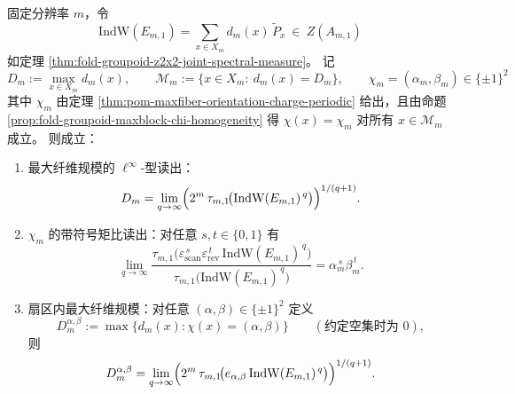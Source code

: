 \begin{corollary}\label{cor:fold-indw-high-q-extract-maxfiber-and-chi}
固定分辨率 \(m\)，令
\[
\mathrm{IndW}(E_{m,1})=\sum_{x\in X_m}d_m(x)\,\widetilde P_x\ \in\ Z(A_{m,1})
\]
如定理 \ref{thm:fold-groupoid-z2x2-joint-spectral-measure}。
记
\[
D_m:=\max_{x\in X_m}d_m(x),\qquad
\mathcal M_m:=\{x\in X_m:\ d_m(x)=D_m\},
\qquad
\chi_m=(\alpha_m,\beta_m)\in\{\pm1\}^2
\]
其中 \(\chi_m\) 由定理 \ref{thm:pom-maxfiber-orientation-charge-periodic} 给出，且由命题 \ref{prop:fold-groupoid-maxblock-chi-homogeneity} 得 \(\chi(x)=\chi_m\) 对所有 \(x\in\mathcal M_m\) 成立。
则成立：
\begin{enumerate}
\normalfont
  \item 最大纤维规模的 \(\ell^\infty\)-型读出：
  \[
  D_m
  =
  \lim_{q\to\infty}\Bigl(2^m\,\tau_{m,1}\!\bigl(\mathrm{IndW}(E_{m,1})^{\,q}\bigr)\Bigr)^{1/(q+1)}.
  \]
  \item \(\chi_m\) 的带符号矩比读出：对任意 \(s,t\in\{0,1\}\) 有
  \[
  \lim_{q\to\infty}
  \frac{\tau_{m,1}\!\bigl(\varepsilon_{\mathrm{scan}}^{\,s}\varepsilon_{\mathrm{rev}}^{\,t}\,\mathrm{IndW}(E_{m,1})^{\,q}\bigr)}
  {\tau_{m,1}\!\bigl(\mathrm{IndW}(E_{m,1})^{\,q}\bigr)}
  =
  \alpha_m^{\,s}\beta_m^{\,t}.
  \]
  \item 扇区内最大纤维规模：对任意 \((\alpha,\beta)\in\{\pm1\}^2\) 定义
  \[
  D_m^{\alpha,\beta}:=\max\{d_m(x):\chi(x)=(\alpha,\beta)\}\qquad(\text{约定空集时为 }0),
  \]
  则
  \[
  D_m^{\alpha,\beta}
  =
  \lim_{q\to\infty}\Bigl(2^m\,\tau_{m,1}\!\bigl(e_{\alpha,\beta}\,\mathrm{IndW}(E_{m,1})^{\,q}\bigr)\Bigr)^{1/(q+1)}.
  \]
\end{enumerate}
\end{corollary}
